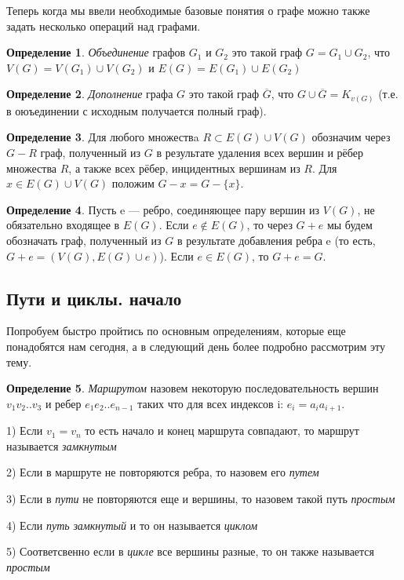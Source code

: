 \documentclass{article}
\theoremstyle{definition}
\newtheorem{definition}{Определение}[section]
\theoremstyle{remark}
\begin{document}
Теперь когда мы ввели необходимые базовые понятия о графе можно также задать несколько операций над графами.

\begin{definition}
    \textit{Объединение} графов $G_{1}$ и $G_{2}$ это такой граф $G =  G_{1} \cup G_{2}$, что $V(G) = V(G_{1}) \cup V(G_{2})$ и $E(G) = E(G_{1}) \cup E(G_{2})$ 
\end{definition}

\begin{definition}
    \textit{Дополнение} графа $G$ это такой граф $\overline{G}$, что $G \cup \overline{G} = K_{v(G)}$ (т.е. в оюъединении с исходным получается полный граф).
\end{definition}

\begin{definition}
Для любого множествa $R \subset E(G) \cup V(G)$ обозначим через $G-R$ граф, полученный из $G$ в результате удаления всех вершин и рёбер множества $R$, а также всех рёбер, инцидентных вершинам из $R$. Для $x \in E(G) \cup V(G)$ положим $G-x = G-\{x\}$.    
\end{definition}

\begin{definition}
Пусть e — ребро, соединяющее пару вершин из $V(G)$, не обязательно входящее в $E(G)$. Если $e \notin E(G)$, то через $G + e$ мы будем обозначать граф, полученный из $G$ в результате добавления ребра e (то есть, $G + e = (V (G), E(G) \cup {e})$). Если $e \in E(G)$, то $G + e = G$.
\end{definition}

\subsection{Пути и циклы. начало}

Попробуем быстро пройтись по основным определениям, которые еще понадобятся нам сегодня, а в следующий день более подробно рассмотрим эту тему.

\begin{definition}
    \textit{Маршрутом} назовем некоторую последовательность вершин $v_1v_2..v_3$ и ребер $e_1e_2..e_{n-1}$ таких что для всех индексов i: $e_i = a_ia_{i+1}$. 
    
    1) Если $v_1 = v_n$ то есть начало и конец маршрута совпадают, то маршрут называется 
    \textit{замкнутым}
    
    2) Если в маршруте не повторяются ребра, то назовем его \textit{путем}
    
    3) Если в \textit{пути} не повторяются еще и вершины, то назовем такой путь \textit{простым}
    
    4) Если \textit{путь} \textit{замкнутый} и то он называется \textit{циклом}

    5) Соответсвенно если в \textit{цикле} все вершины разные, то он также называется \textit{простым}
\end{definition}
\end{document}

